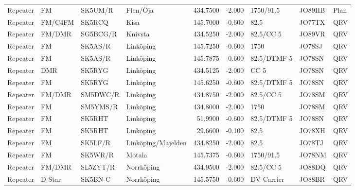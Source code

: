 {\begin{landscape}
\begin{longtable}{llllrrlll}
	Repeater          & FM         & SK5UM/R  & Flen/Öja             &     434.7500 &     -2.000 & 1750/91.5         & JO89HB      & Plan     \\
	Repeater          & FM/C4FM    & SK5RCQ   & Kisa                 &     145.7000 &     -0.600 & 82.5              & JO77TX      & QRV      \\
	Repeater          & FM/DMR     & SG5BCG/R & Knivsta              &     434.5250 &     -2.000 & 82.5/CC 5         & JO89VR      & QRV      \\
	Repeater          & FM         & SK5AS/R  & Linköping            &     145.7250 &     -0.600 & 1750              & JO78SJ      & QRV      \\
	Repeater          & FM         & SK5AS/R  & Linköping            &     145.7875 &     -0.600 & 82.5/DTMF 5       & JO78SN      & QRV      \\
	Repeater          & DMR        & SK5RYG   & Linköping            &     434.5125 &     -2.000 & CC 5              & JO78SN      & QRV      \\
	Repeater          & FM         & SK5RYG   & Linköping            &     145.6250 &     -0.600 & 82.5/DTMF 5       & JO78SN      & QRV      \\
	Repeater          & FM/DMR     & SM5DWC/R & Linköping            &     434.8750 &     -2.000 & 82.5/CC 5         & JO78SM      & QRV      \\
	Repeater          & FM         & SM5YMS/R & Linköping            &     434.8000 &     -2.000 & 1750              & JO78SM      & QRV      \\
	Repeater          & FM         & SK5RHT   & Linköping            &      51.9900 &     -0.600 & 82.5/DTMF 5       & JO78SN      & QRV      \\
	Repeater          & FM         & SK5RHT   & Linköping            &      29.6600 &     -0.100 & 82.5              & JO78XH      & QRV      \\
	Repeater          & FM         & SK5LF/R  & Linköping/Majelden   &     434.8250 &     -2.000 & 82.5              & JO78TJ      & QRV      \\
	Repeater          & FM         & SK5WR/R  & Motala               &     145.7375 &     -0.600 & 1750/91.5         & JO78NM      & QRV      \\
	Repeater          & FM/DMR     & SL5ZYT/R & Norrköping           &     434.9500 &     -2.000 & 82.5/CC 5         & JO88DQ      & QRV      \\
	Repeater          & D-Star     & SK5BN-C  & Norrköping           &     145.5750 &     -0.600 & DV Carrier        & JO88BR      & QRV      \\

\end{longtable}
\end{landscape}}
